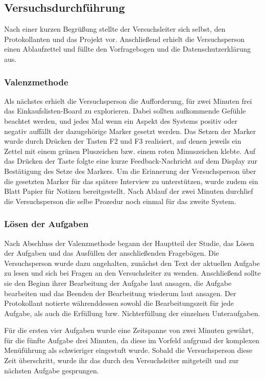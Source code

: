 \subsection{Versuchsdurchführung}
Nach einer kurzen Begrüßung stellte der Versuchsleiter sich selbst, den Protokollanten und das Projekt vor. Anschließend erhielt die Versuchsperson einen Ablaufzettel und füllte den Vorfragebogen und die Datenschutzerklärung aus.


\subsubsection{Valenzmethode}
Als nächstes erhielt die Versuchsperson die Aufforderung, für zwei Minuten frei das Einkaufslisten-Board zu explorieren. Dabei sollten aufkommende Gefühle beachtet werden, und jedes Mal wenn ein Aspekt des Systems positiv oder negativ auffällt der dazugehörige Marker gesetzt werden. Das Setzen der Marker wurde durch Drücken der Tasten F2 und F3 realisiert, auf denen jeweils ein Zettel mit einem grünen Pluszeichen bzw. einem roten Minuszeichen klebte. Auf das Drücken der Taste folgte eine kurze Feedback-Nachricht auf dem Display zur Bestätigung des Setze des Markers. Um die Erinnerung der Versuchsperson über die gesetzten Marker für das spätere Interview zu unterstützen, wurde zudem ein Blatt Papier für Notizen bereitgestellt. Nach Ablauf der zwei Minuten durchlief die Versuchsperson die selbe Prozedur noch einmal für das zweite System.



\subsubsection{Lösen der Aufgaben}
Nach Abschluss der Valenzmethode begann der Hauptteil der Studie, das Lösen der Aufgaben und das Ausfüllen der anschließenden Fragebögen. Die Versuchsperson wurde dazu angehalten, zunächst den Text der aktuellen Aufgabe zu lesen und sich bei Fragen an den Versuchsleiter zu wenden. Anschließend sollte sie den Beginn ihrer Bearbeitung der Aufgabe laut ansagen, die Aufgabe bearbeiten und das Beenden der Bearbeitung wiederum laut ansagen. Der Protokollant notierte währenddessen sowohl die Bearbeitungszeit für jede Aufgabe, als auch die Erfüllung bzw. Nichterfüllung der einzelnen Unteraufgaben.

Für die ersten vier Aufgaben wurde eine Zeitspanne von zwei Minuten gewährt, für die fünfte Aufgabe drei Minuten, da diese im Vorfeld aufgrund der komplexen Menüführung als schwieriger eingestuft wurde. Sobald die Versuchsperson diese Zeit überschritt, wurde ihr das durch den Versuchsleiter mitgeteilt und zur nächsten Aufgabe gesprungen.

